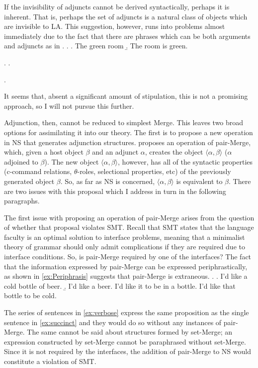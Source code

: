 \documentclass[MilwayThesis]{subfiles}
\begin{document}
If the invisibility of adjuncts cannot be derived syntactically, perhaps it is inherent.
That is, perhaps the set of adjuncts is a natural class of objects which are invisible to LA.
This suggestion, however, runs into problems almost immediately due to the fact that there are phrases which can be both arguments and adjuncts as in .
\ex. \label{ex:Adjective}
\a. The green room
\b. The room is green.

\ex. \label{ex:PP} 
\a. 

\ex. \label{ex:ProgP}

It seems that, absent a significant amount of stipulation, this is not a promising approach, so I will not pursue this further.

Adjunction, then, cannot be reduced to simplest Merge.
This leaves two broad options for assimilating it into our theory.
The first is to propose a new operation in NS that generates adjunction structures.
\textcite{chomsky2004beyond} proposes an operation of pair-Merge, which, given a host object $\beta$ and an adjunct $\alpha$, creates the object $\langle\alpha,\beta\rangle$ ($\alpha$ adjoined to $\beta$).
The new object $\langle\alpha,\beta\rangle$, however, has all of the syntactic properties (c-command relations, $\theta$-roles, selectional properties, etc) of the previously generated object $\beta$.
So, as far as NS is concerned, $\langle\alpha,\beta\rangle$ is equivalent to $\beta$.
There are two issues with this proposal which I address in turn in the following paragraphs.

The first issue with proposing an operation of pair-Merge arises from the question of whether that proposal violates SMT.
Recall that SMT states that the language faculty is an optimal solution to interface problems, meaning that a minimalist theory of grammar should only admit complications if they are required due to interface conditions.
So, is pair-Merge required by one of the interfaces?
The fact that the information expressed by pair-Merge can be expressed periphrastically, as shown in \cref{ex:Periphrasis} suggests that pair-Merge is extraneous.
\ex.\label{ex:Periphrasis}
\a. I'd like a cold bottle of beer.\label{ex:succinct}
\b. I'd like a beer. I'd like it to be in a bottle. I'd like that bottle to be cold.\label{ex:verbose}

The series of sentences in \cref{ex:verbose} express the same proposition as the single sentence in \cref{ex:succinct} and they would do so without any instances of pair-Merge.
The same cannot be said about structures formed by set-Merge; an expression constructed by set-Merge cannot be paraphrased without set-Merge.
Since it is not required by the interfaces, the addition of pair-Merge to NS would constitute a violation of SMT.
\end{document}
